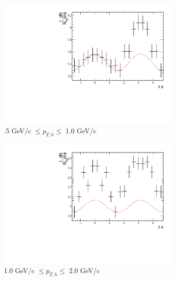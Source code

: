 \begin{figure}[htbp]
	\begin{subfigure}{0.5\textwidth}
		\includegraphics[width=\textwidth]{Plots/Correlations/raw/NPE_eh_corr_raw_primpt_4_5_cent_2_3_assopt_1_1.pdf}
		\caption{.5 GeV/c $\leq p_{T,h} \leq$ 1.0 GeV/c}
		\label{fig:Raw4060a}
	\end{subfigure}	
	\begin{subfigure}{0.5\textwidth}
		\includegraphics[width=\textwidth]{Plots/Correlations/raw/NPE_eh_corr_raw_primpt_4_5_cent_2_3_assopt_2_2.pdf}
		\caption{1.0 GeV/c $\leq p_{T,h} \leq$ 2.0 GeV/c}
		\label{fig:Raw4060b}
	\end{subfigure}	
\begin{center}
	\begin{subfigure}{0.5\textwidth}

\end{subfigure}
\end{center}
\end{figure}
